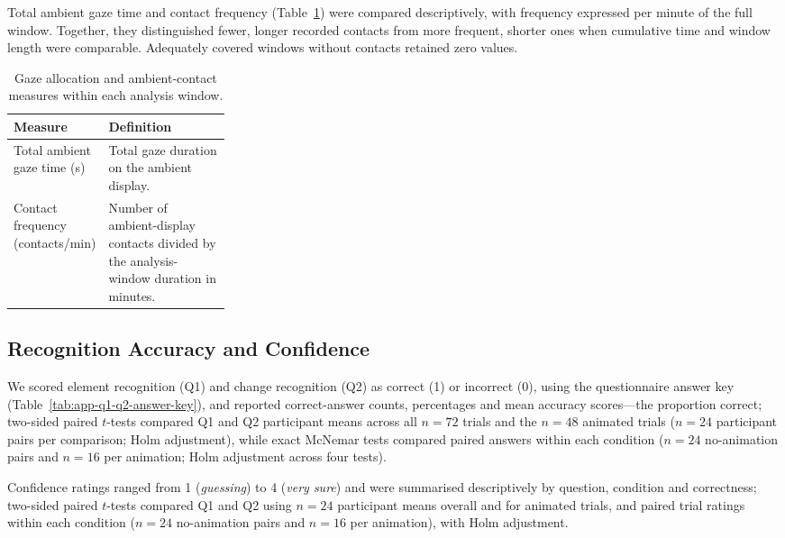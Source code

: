 \documentclass[
english,                 %
bibtex,                  %
includeExtraAbstracts, %
]{kththesis}
\newenvironment{evidenceblock}{\par\addvspace{6pt}\noindent\begin{minipage}{\linewidth}}{\end{minipage}\par\addvspace{6pt}}
\numberwithin{listing}{chapter}
\begin{document}
\begin{evidenceblock}
\normalsize
Total ambient gaze time and contact frequency (Table~\ref{tab:gaze-allocation-measures}) were compared descriptively, with frequency expressed per minute of the full window. Together, they distinguished fewer, longer recorded contacts from more frequent, shorter ones when cumulative time and window length were comparable. Adequately covered windows without contacts retained zero values.

\begin{table}[H]
\centering
\caption[Gaze allocation and ambient contacts]{Gaze allocation and ambient-contact measures within each analysis window.}
\label{tab:gaze-allocation-measures}
\scriptsize
\renewcommand{\arraystretch}{1.05}
\setlength{\tabcolsep}{4pt}
\setlength{\extrarowheight}{0pt}
\begin{tabularx}{\linewidth}{@{}>{\raggedright\arraybackslash}p{0.28\linewidth} >{\raggedright\arraybackslash}X@{}}
\toprule
Measure & Definition \\ \midrule
Total ambient gaze time (s)
& Total gaze duration on the ambient display. \\
Contact frequency (contacts/min)
& Number of ambient-display contacts divided by the analysis-window duration in minutes. \\
\bottomrule
\end{tabularx}
\end{table}
\end{evidenceblock}

\subsection{Recognition Accuracy and Confidence}
\label{sec:recognition-accuracy-confidence}

We scored element recognition (Q1) and change recognition (Q2) as correct (1) or incorrect (0), using the questionnaire answer key (Table~\ref{tab:app-q1-q2-answer-key}), and reported correct-answer counts, percentages and mean accuracy scores---the proportion correct; two-sided paired $t$-tests compared Q1 and Q2 participant means across all $n = 72$ trials and the $n = 48$ animated trials ($n = 24$ participant pairs per comparison; Holm adjustment), while exact McNemar tests compared paired answers within each condition ($n = 24$ no-animation pairs and $n = 16$ per animation; Holm adjustment across four tests).

Confidence ratings ranged from 1 (\emph{guessing}) to 4 (\emph{very sure}) and were summarised descriptively by question, condition and correctness; two-sided paired $t$-tests compared Q1 and Q2 using $n = 24$ participant means overall and for animated trials, and paired trial ratings within each condition ($n = 24$ no-animation pairs and $n = 16$ per animation), with Holm adjustment.
\end{document}
